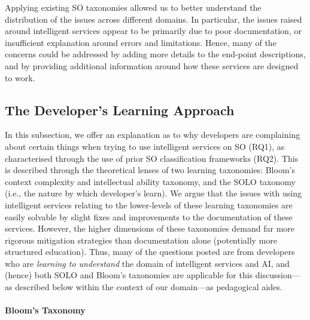 Applying existing SO taxonomies allowed us to better understand the distribution of the issues across different domains. In particular, the issues raised around intelligent services appear to be primarily due to poor documentation, or insufficient explanation around errors and limitations. Hence, many of the concerns could be addressed by adding more details to the end-point descriptions, and by providing additional information around how these services are designed to work. 

\subsection{The Developer's Learning Approach}
\label{icse2020:ssec:bloomsolo}

In this subsection, we offer an explanation as to why developers are complaining about certain things when trying to use intelligent services on SO (RQ1), as characterised through the use of prior SO classification frameworks (RQ2). This is described through the theoretical lenses of two learning taxonomies: Bloom's context complexity and intellectual ability taxonomy, and the SOLO taxonomy (i.e., the nature by which developer's learn). We argue that the issues with using intelligent services relating to the lower-levels of these learning taxonomies are easily solvable by slight fixes and improvements to the documentation of these services. However, the higher dimensions of these taxonomies demand far more rigorous mitigation strategies than documentation alone (potentially more structured education). Thus, many of the questions posted are from developers who are \textit{learning to understand} the domain of intelligent services and AI, and (hence) both SOLO and Bloom's taxonomies are applicable for this discussion---as described below within the context of our domain---as pedagogical aides.

\paragraph{Bloom's Taxonomy}

